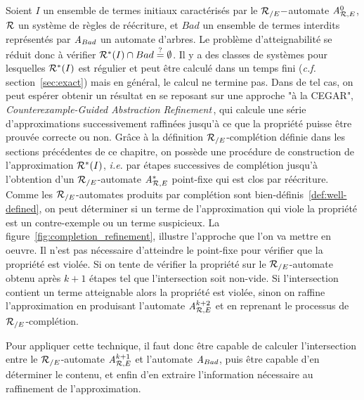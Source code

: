 Soient $I$ un ensemble de termes initiaux caractérisés par le ${\mathcal R_{/E}}-$automate
${\mathit A}_{\mathcal R,E}^0$, $\mathcal R$ un système de règles de réécriture, et $Bad$ un ensemble
de termes interdits représentés par $\mathit A_{Bad}$ un automate d'arbres.
Le problème d'atteignabilité se réduit donc à vérifier 
$\mathcal R^*(I) \cap Bad \stackrel{?}{=}\emptyset$. 
Il y a des classes de systèmes pour lesquelles $\mathcal R^*(I)$ est régulier
et peut être calculé dans un temps fini (\textit{c.f.} section~\ref{sec:exact}) mais
en général, le calcul ne termine pas. Dans de tel cas, on peut espérer 
obtenir un résultat en se reposant sur une approche 
"à la CEGAR", \textit{Counterexample-Guided Abstraction 
  Refinement\,\cite{DBLP:conf/time/Clarke03}}, qui calcule une série d'approximations
successivement raffinées jusqu'à ce que la propriété puisse être prouvée
correcte ou non. 
Grâce à la définition ${\mathcal R_{/E}}$-complétion définie dans les sections précédentes de ce chapitre,
on possède une procédure de construction de l'approximation $\mathcal R^*(I)$, \textit{i.e.}
par étapes successives de complétion jusqu'à l'obtention d'un ${\mathcal R_{/E}}$-automate ${\mathit A}_{\mathcal R,E}^*$
point-fixe qui est clos par réécriture. Comme les ${\mathcal R_{/E}}$-automates produits par complétion
sont bien-définis~\ref{def:well-defined}, on peut déterminer si un terme de l'approximation
qui viole la propriété est un contre-exemple ou un terme suspicieux.
La figure~\ref{fig:completion_refinement}, illustre l'approche que l'on va mettre en oeuvre.
Il n'est pas nécessaire d'atteindre le point-fixe pour vérifier que la propriété est violée.
Si on tente de vérifier la propriété sur le ${\mathcal R_{/E}}$-automate obtenu après $k+1$ étapes
tel que l'intersection soit non-vide. Si l'intersection 
contient un terme atteignable alors la propriété est violée, sinon on raffine
l'approximation en produisant l'automate ${\mathit A}_{\mathcal R,E}^{k+2}$
et en reprenant le processus de ${\mathcal R_{/E}}$-complétion.


Pour appliquer cette technique, il faut donc être capable de calculer l'intersection entre
le ${\mathcal R_{/E}}$-automate ${\mathit A}_{\mathcal R,E}^{k+1}$ et l'automate $\mathit A_{Bad}$, puis être capable d'en déterminer 
le contenu, et enfin d'en extraire l'information nécessaire au raffinement de l'approximation.

